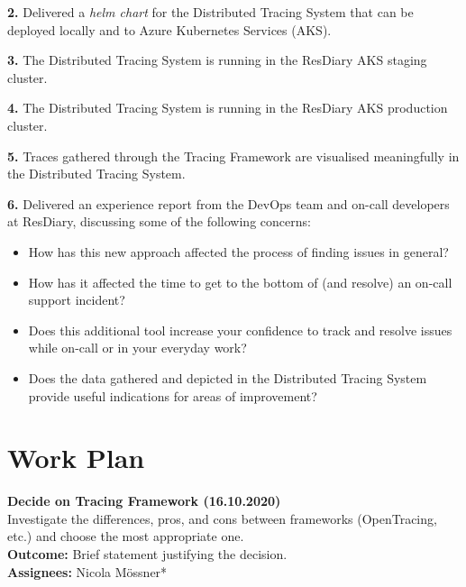 \documentclass[11pt]{article}
\begin{document}
\textbf{2.} Delivered a \textit{helm chart}\cite{helmcharts} for the Distributed Tracing System that can be deployed locally and to Azure Kubernetes Services (AKS).

\textbf{3.} The Distributed Tracing System is running in the ResDiary AKS staging cluster.

\textbf{4.} The Distributed Tracing System is running in the ResDiary AKS production cluster.

\textbf{5.} Traces gathered through the Tracing Framework are visualised meaningfully in the Distributed Tracing System.

\textbf{6.} Delivered an experience report from the DevOps team and on-call developers at ResDiary, discussing some of the following concerns:
\begin{itemize}
    \item How has this new approach affected the process of finding issues in general?
    \item How has it affected the time to get to the bottom of (and resolve) an on-call support incident?
    \item Does this additional tool increase your confidence to track and resolve issues while on-call or in your everyday work?
    \item Does the data gathered and depicted in the Distributed Tracing System provide useful indications for areas of improvement?
\end{itemize}

\section{Work Plan}
\label{WorkPlan}


\textbf{Decide on Tracing Framework (16.10.2020)}\\
Investigate the differences, pros, and cons between frameworks (OpenTracing, etc.) and choose the most appropriate one.\\
\textbf{Outcome:} Brief statement justifying the decision.\\
\textbf{Assignees:} Nicola M\"{o}ssner*
\end{document}
